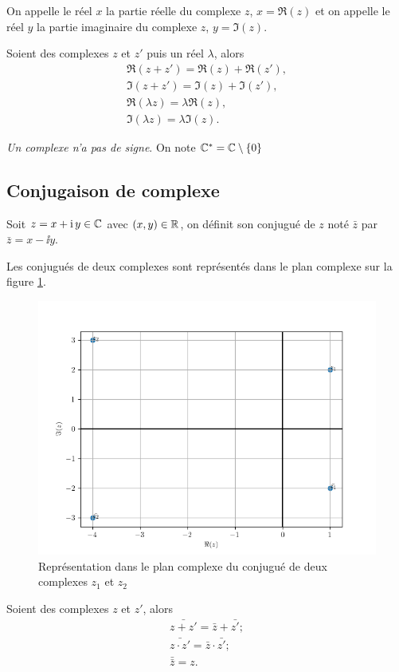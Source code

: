 %
On appelle le réel \(x\) la partie réelle du complexe \(z\), \(x=\Re(z)\) et on appelle le réel \(y\) la partie imaginaire du complexe \(z\), \(y=\Im(z)\).
%
\begin{prop}
  Soient des complexes \(z\) et \(z'\) puis un réel \(\lambda\), alors
  \begin{gather}
    \Re(z+z')=\Re(z)+\Re(z'), \\
    \Im(z+z')=\Im(z)+\Im(z'),\\
    \Re(\lambda z)=\lambda \Re(z),\\
    \Im(\lambda z)=\lambda \Im(z).
  \end{gather}
\end{prop}
%
\emph{Un complexe n'a pas de signe}. On note \(\mathbb{C}^*=\mathbb{C} \setminus \{0\}\)
%
\subsection{Conjugaison de complexe}
\label{subsec:conjugaisoncomplexe}
\begin{defdef}
  Soit \(z=x+\operatorname{i} y \in \mathbb{C}\) avec \((x,y)\in \mathbb{R}\), on définit son conjugué de \(z\) noté \(\bar{z}\) par \(\bar{z}=x- \ii y\).
\end{defdef}
Les conjugués de deux complexes sont représentés dans le plan complexe sur la figure \ref{fig:conjugueComplexe}.
\begin{figure}
    \centering
    \includegraphics[scale=0.7]{conjugue.png}
    \caption{Représentation dans le plan complexe du conjugué de deux complexes $z_1$ et $z_2$}
    \label{fig:conjugueComplexe}
\end{figure}
%
\begin{prop}
  Soient des complexes \(z\) et \(z'\), alors
  \begin{gather}
    \bar{z+z'}=\bar{z} + \bar{z'}; \\
    \bar{z \cdot z'}=\bar{z} \cdot \bar{z'}; \\
    \bar{\bar{z}}=z.
  \end{gather}
\end{prop}
